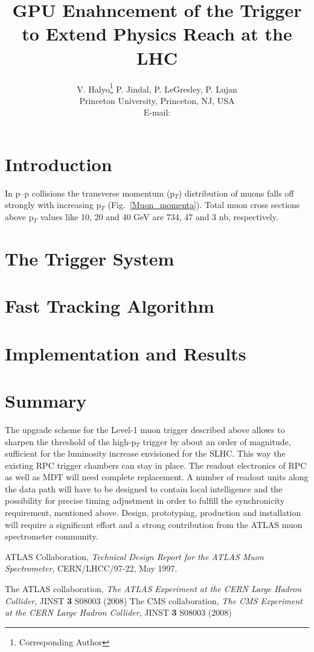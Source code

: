 \documentclass{JINST}
\title{GPU Enahncement of the Trigger to Extend Physics Reach at the LHC}
\author{V. Halyo\thanks{Corresponding Author} P. Jindal, P. LeGresley, P. Lujan \\
\llap Princeton University, Princeton, NJ, USA \\
E-mail: \email{vhalyo@gmail.com}}
\begin{document}
% 
% 
\section{Introduction} 
% 
In p--p collisions the transverse 
momentum (p$_T$) distribution of muons falls off strongly with increasing p$_T$ 
(Fig.~\ref{Muon_momenta}). Total muon cross sections above p$_T$ values like 10, 20 and 40 
GeV are 734, 47 and 3 nb, respectively. 
% 

\section{The Trigger System}
%

\section{Fast Tracking Algorithm}


\section{Implementation and Results}

%
\section{Summary}
%
The upgrade scheme for the Level-1 muon trigger described above allows to sharpen the threshold of
the  high-p$_T$ trigger by about an order of magnitude, sufficient for the luminosity increase
envisioned  for the SLHC. This way the existing RPC trigger chambers can stay in place. The readout
electronics of  RPC as well as MDT will need complete replacement. A number of readout units along
the data path will  have to be designed to contain local intelligence and the possibility for
precise timing adjustment in  order to fulfill the synchronicity requirement, mentioned above.
Design, prototyping, production and  installation will require a significant effort and a strong
contribution from the ATLAS muon  spectrometer community. 


\begin{thebibliography}{9}

ATLAS Collaboration,
\textsl{Technical Design Report for the ATLAS Muon Spectrometer},
CERN/LHCC/97-22, May 1997.


The ATLAS collaboration,
\emph{The ATLAS Experiment at the CERN Large Hadron Collider},
JINST {\textbf 3}  S08003 (2008)
%
The CMS collaboration,
\emph{The CMS Experiment at the CERN Large Hadron Collider},
JINST {\textbf 3}  S08003 (2008)
%


\end{thebibliography}
\end{document}
